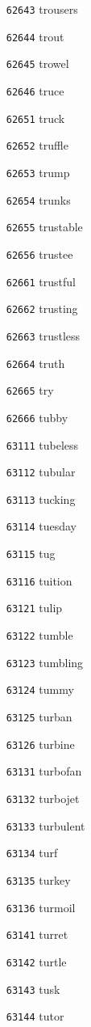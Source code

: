 \documentclass[twoside,11pt]{article}
\begin{document}
\begin{multicols}{5}
\begin{enumerate}
\item[\texttt{62643}] trousers
\item[\texttt{62644}] trout
\item[\texttt{62645}] trowel
\item[\texttt{62646}] truce
\item[\texttt{62651}] truck
\item[\texttt{62652}] truffle
\item[\texttt{62653}] trump
\item[\texttt{62654}] trunks
\item[\texttt{62655}] trustable
\item[\texttt{62656}] trustee
\item[\texttt{62661}] trustful
\item[\texttt{62662}] trusting
\item[\texttt{62663}] trustless
\item[\texttt{62664}] truth
\item[\texttt{62665}] try
\item[\texttt{62666}] tubby
\item[\texttt{63111}] tubeless
\item[\texttt{63112}] tubular
\item[\texttt{63113}] tucking
\item[\texttt{63114}] tuesday
\item[\texttt{63115}] tug
\item[\texttt{63116}] tuition
\item[\texttt{63121}] tulip
\item[\texttt{63122}] tumble
\item[\texttt{63123}] tumbling
\item[\texttt{63124}] tummy
\item[\texttt{63125}] turban
\item[\texttt{63126}] turbine
\item[\texttt{63131}] turbofan
\item[\texttt{63132}] turbojet
\item[\texttt{63133}] turbulent
\item[\texttt{63134}] turf
\item[\texttt{63135}] turkey
\item[\texttt{63136}] turmoil
\item[\texttt{63141}] turret
\item[\texttt{63142}] turtle
\item[\texttt{63143}] tusk
\item[\texttt{63144}] tutor

\end{enumerate}
\end{multicols}
\end{document}

